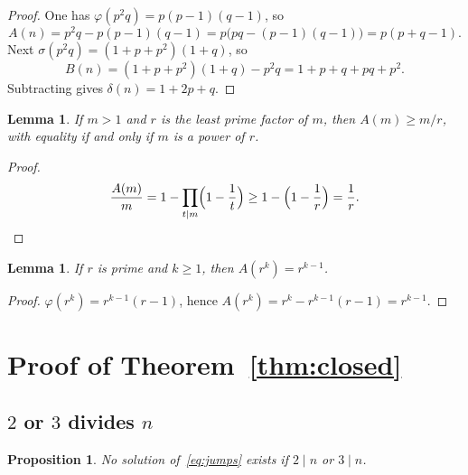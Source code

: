 \documentclass[11pt,reqno]{amsart}
\newcommand{\ph}{\varphi}
\newcommand{\sig}{\sigma}
\newtheorem{lemma}[theorem]{Lemma}
\newtheorem{proposition}[theorem]{Proposition}
\theoremstyle{definition}
\begin{document}
\begin{proof}
One has \(\ph(p^2q)=p(p-1)(q-1)\), so
\[
A(n)=p^2q-p(p-1)(q-1)=p\bigl(pq-(p-1)(q-1)\bigr)=p(p+q-1).
\]
Next \(\sig(p^2q)=(1+p+p^2)(1+q)\), so
\[
B(n)=(1+p+p^2)(1+q)-p^2q=1+p+q+pq+p^2.
\]
Subtracting gives \(\delta(n)=1+2p+q\).
\end{proof}

\begin{lemma}
\label{lem:cot}
If \(m>1\) and \(r\) is the least prime factor of \(m\), then \(A(m)\ge m/r\), with equality if and only if \(m\) is a power of \(r\).
\end{lemma}

\begin{proof}
\[
\frac{A(m)}{m}=1-\prod_{t\mid m}\Bigl(1-\frac{1}{t}\Bigr)\ge 1-\Bigl(1-\frac{1}{r}\Bigr)=\frac{1}{r}.
\]
\end{proof}

\begin{lemma}
\label{lem:Ark}
If \(r\) is prime and \(k\ge 1\), then \(A(r^k)=r^{k-1}\).
\end{lemma}

\begin{proof}
\(\ph(r^k)=r^{k-1}(r-1)\), hence \(A(r^k)=r^k-r^{k-1}(r-1)=r^{k-1}\).
\end{proof}

\section{Proof of Theorem~\ref{thm:closed}}
\label{sec:proof1}

\subsection{\(2\) or \(3\) divides \(n\)}

\begin{proposition}
\label{prop:23}
No solution of~\eqref{eq:jumps} exists if \(2\mid n\) or \(3\mid n\).
\end{proposition}
\end{document}
